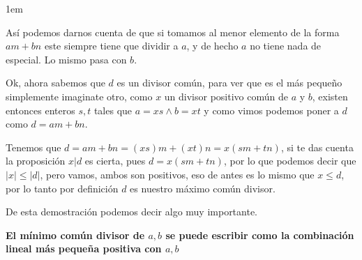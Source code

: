 \documentclass[12pt, fleqn]{report}                             %
\newenvironment{SmallIndentation}[1][0.75em]                    %
    {\begin{adjustwidth}{#1}{}\begin{footnotesize}}                 %
    {\end{footnotesize}\end{adjustwidth}}                           %
\begin{document}
\begin{SmallIndentation}[1em]
                Así podemos darnos cuenta de que si tomamos al menor elemento de la forma $am+bn$ este
                siempre tiene que dividir a $a$, y de hecho $a$ no tiene nada de especial.
                Lo mismo pasa con $b$.

                Ok, ahora sabemos que $d$ es un divisor común, para ver que es el más pequeño
                simplemente imaginate otro, como $x$ un divisor positivo común de $a$ y $b$,
                existen entonces enteros $s,t$ tales que $a=xs \land b=xt$ y como vimos podemos poner a 
                $d$ como $d=am+bn$.

                Tenemos que $d = am+bn = (xs)m+(xt)n = x(sm+tn)$, si te das cuenta la proposición
                $x|d$ es cierta, pues $d = x(sm+tn)$, por lo que podemos decir que $|x| \leq |d|$, 
                pero vamos, ambos son positivos, eso de antes es lo mismo que $x \leq d$, por lo
                tanto por definición $d$ es nuestro máximo común divisor.

            \end{SmallIndentation}


            De esta demostración podemos decir algo muy importante.

            \textbf{El mínimo común divisor de $a, b$ se puede escribir como la combinación lineal
            más pequeña positiva con $a, b$}

        \clearpage
\end{document}
